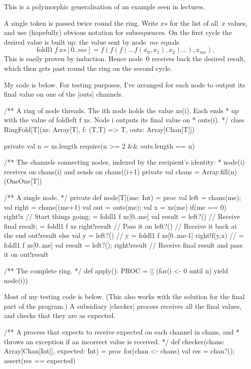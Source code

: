 \begin{answer}
\Small
This is a polymorphic generalisation of an example seen in lectures.

A single token is passed twice round the ring.  Write $xs$ for the list of
all~$x$ values, and use (hopefully) obvious notation for subsequences.  On the first cycle the desired
value is built up: the value sent by node~$me$ equals
\[
\mathrm{foldl1}~f~ xs[0..me] = 
  f(f(f(\ldots f(x_0, x_1), x_2) \ldots ), x_{me}),
\]
This is easily proven by induction.  Hence node~0 receives back the desired
result, which then gets past round the ring on the second cycle.

My code is below.  For testing purposes, I've arranged for each node to output
its final value on one of the |outs| channels. 
%
\begin{scala}
/** A ring of node threads.  The ith node holds the value xs(i).  Each ends
  * up with the value of foldleft f xs.  Node i outputs its final value on
  * outs(i).  */
class RingFold[T](xs: Array[T], f: (T,T) => T, outs: Array[Chan[T]]){
  private val n = xs.length
  require(n >= 2 && outs.length == n)

  /** The channels connecting nodes, indexed by the recipient's identity:
    * node(i) receives on chans(i) and sends on chans((i+1)%
  private val chans = Array.fill(n)(OneOne[T]) 

  /** A single node. */
  private def node[T](me: Int) = proc{
    val left = chans(me); val right = chans((me+1)%
    val out = outs(me); val x = xs(me)
    if(me == 0){
      right!x // Start things going; = foldl1 f xs[0..me]
      val result = left?() // Receive final result; = foldl1 f xs
      right!result  // Pass it on
      left?()       // Receive it back at the end
      out!result
    }
    else{
      val y = left?() // y = foldl1 f xs[0..me-1]
      right!f(y,x)    // = foldl1 f xs[0..me]
      val result = left?(); right!result // Receive final result and pass it on
      out!result
    }
  }  

  /** The complete ring. */
  def apply(): PROC = || (for(i <- 0 until n) yield node(i))
}
\end{scala}

Most of my testing code is below.  (This also works with the solution for the
final part of the program.)  A subsidiary |checker| process receives all the
final values, and checks that they are as expected.
%  
\begin{scala}
  /** A process that expects to receive expected on each channel in chans, and
    * throws an exception if an incorrect value is received. */
  def checker(chans: Array[Chan[Int]], expected: Int) = proc{
    for(chan <- chans){ val res = chan?(); assert(res == expected) }
  }


\end{scala}
\end{answer}
